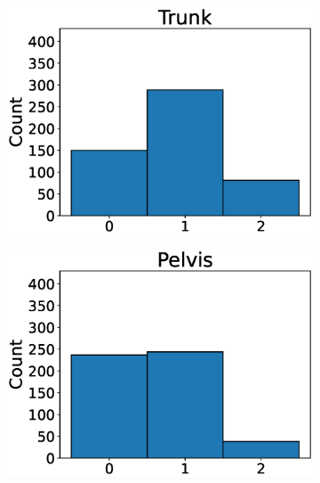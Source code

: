 \begin{figure}
  \centering
  \begin{subfigure}[t]{0.24\textwidth}
    \includegraphics[width=\textwidth]{files/figs/met/trunk-label-hist.eps}
    \caption{}
    \label{fig:trunk-labels}
  \end{subfigure}
  \begin{subfigure}[t]{0.24\textwidth}
    \includegraphics[width=\textwidth]{files/figs/met/pelvis-label-hist.eps}
    \caption{}
    \label{fig:pelvis-labels}
  \end{subfigure}
  \begin{subfigure}[t]{0.24\textwidth}

\end{subfigure}
\end{figure}
